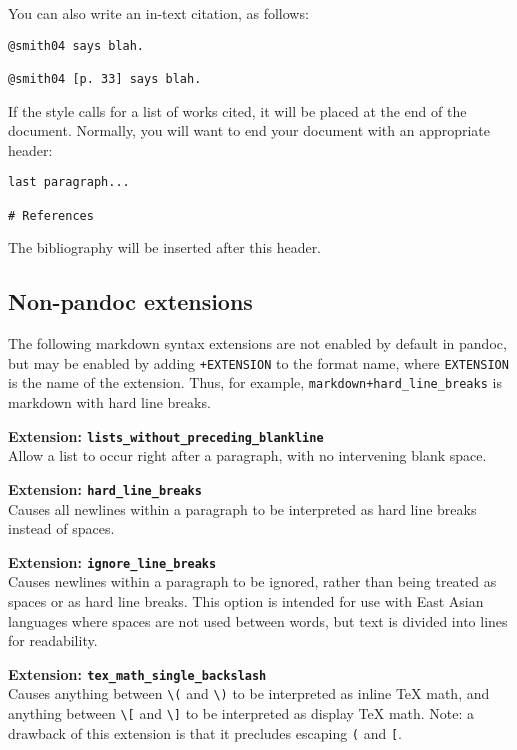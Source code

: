 \documentclass[]{article}
\begin{document}
You can also write an in-text citation, as follows:

\begin{verbatim}
@smith04 says blah.

@smith04 [p. 33] says blah.
\end{verbatim}

If the style calls for a list of works cited, it will be placed at the
end of the document. Normally, you will want to end your document with
an appropriate header:

\begin{verbatim}
last paragraph...

# References
\end{verbatim}

The bibliography will be inserted after this header.

\subsection{Non-pandoc extensions}

The following markdown syntax extensions are not enabled by default in
pandoc, but may be enabled by adding \texttt{+EXTENSION} to the format
name, where \texttt{EXTENSION} is the name of the extension. Thus, for
example, \texttt{markdown+hard\_line\_breaks} is markdown with hard line
breaks.

\textbf{Extension: \texttt{lists\_without\_preceding\_blankline}}\\Allow
a list to occur right after a paragraph, with no intervening blank
space.

\textbf{Extension: \texttt{hard\_line\_breaks}}\\Causes all newlines
within a paragraph to be interpreted as hard line breaks instead of
spaces.

\textbf{Extension: \texttt{ignore\_line\_breaks}}\\Causes newlines
within a paragraph to be ignored, rather than being treated as spaces or
as hard line breaks. This option is intended for use with East Asian
languages where spaces are not used between words, but text is divided
into lines for readability.

\textbf{Extension: \texttt{tex\_math\_single\_backslash}}\\Causes
anything between \texttt{\textbackslash{}(} and
\texttt{\textbackslash{})} to be interpreted as inline TeX math, and
anything between \texttt{\textbackslash{}{[}} and
\texttt{\textbackslash{}{]}} to be interpreted as display TeX math.
Note: a drawback of this extension is that it precludes escaping
\texttt{(} and \texttt{{[}}.
\end{document}
